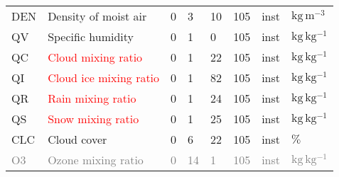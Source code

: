 \begin{table}[H]
\begin{tabular}{p{2.0cm}p{5.0cm}p{0.8cm}p{0.8cm}p{0.8cm}p{0.9cm}p{1cm}p{1cm}}
DEN                        &  Density of moist air             &               0                                   &                     3                       &                    10                      &                 105                         &                      inst                   &        $\mathrm{kg\,m^{-3}}$ \\
QV                         &  Specific humidity                &               0                                   &                     1                       &                    0                       &                 105                         &                      inst                   &        $\mathrm{kg\,kg^{-1}}$ \\
QC                         &  \textcolor{red}{Cloud mixing ratio}\footnotemark[1]&             0                   &                     1                       &                    22                      &                 105                         &                      inst                   &        $\mathrm{kg\,kg^{-1}}$ \\
QI                         &  \textcolor{red}{Cloud ice mixing ratio}\footnotemark[1]&         0                   &                     1                       &                    82                      &                 105                         &                      inst                   &        $\mathrm{kg\,kg^{-1}}$ \\
QR                         &  \textcolor{red}{Rain mixing ratio}\footnotemark[1]&              0                   &                     1                       &                    24                      &                 105                         &                      inst                   &        $\mathrm{kg\,kg^{-1}}$ \\
QS                         &  \textcolor{red}{Snow mixing ratio}\footnotemark[1]&              0                   &                     1                       &                    25                      &                 105                         &                      inst                   &        $\mathrm{kg\,kg^{-1}}$ \\
CLC                        &  Cloud cover                       &              0                                   &                     6                       &                    22                      &                 105                         &                      inst                   &        $\mathrm{\%}$ \\
\textcolor{gray}{O3}       &  \textcolor{gray}{Ozone mixing ratio}\footnotemark[2] &              \textcolor{gray}{0}              &        \textcolor{gray}{14}                 &      \textcolor{gray}{1}                   &     \textcolor{gray}{105}                   &     \textcolor{gray}{inst}                  &        \textcolor{gray}{$\mathrm{kg\,kg^{-1}}$} \\                                             
  \bottomrule
 \end{tabular}
\end{table}
